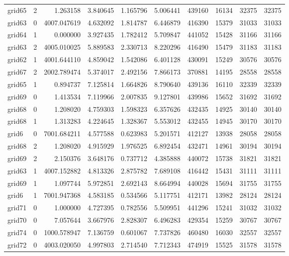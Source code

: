 \begin{longtable}{|l|r|r|r|r|r|r|r|r|r|}
grid65 & 2 & 1.263158 & 3.840645 & 1.165796 & 5.006441 & 439160 & 16134 & 32375 & 32375 \\
grid63 & 0 & 4007.047619 & 4.632092 & 1.814787 & 6.446879 & 416390 & 15379 & 31033 & 31033 \\
grid64 & 1 & 0.000000 & 3.927435 & 1.782412 & 5.709847 & 441052 & 15428 & 31166 & 31166 \\
grid63 & 2 & 4005.010025 & 5.889583 & 2.330713 & 8.220296 & 416490 & 15479 & 31183 & 31183 \\
grid62 & 1 & 4001.644110 & 4.859042 & 1.542086 & 6.401128 & 430091 & 15249 & 30576 & 30576 \\
grid67 & 2 & 2002.789474 & 5.374017 & 2.492156 & 7.866173 & 370881 & 14195 & 28558 & 28558 \\
grid65 & 1 & 0.894737 & 7.125814 & 1.664826 & 8.790640 & 439136 & 16110 & 32339 & 32339 \\
grid69 & 0 & 1.413534 & 7.119966 & 2.007835 & 9.127801 & 439986 & 15652 & 31692 & 31692 \\
grid68 & 0 & 1.208020 & 4.759303 & 1.598323 & 6.357626 & 432435 & 14925 & 30140 & 30140 \\
grid68 & 1 & 1.313283 & 4.224645 & 1.328367 & 5.553012 & 432455 & 14945 & 30170 & 30170 \\
grid6 & 0 & 7001.684211 & 4.577588 & 0.623983 & 5.201571 & 412127 & 13938 & 28058 & 28058 \\
grid68 & 2 & 1.208020 & 4.915929 & 1.976525 & 6.892454 & 432471 & 14961 & 30194 & 30194 \\
grid69 & 2 & 2.150376 & 3.648176 & 0.737712 & 4.385888 & 440072 & 15738 & 31821 & 31821 \\
grid63 & 1 & 4007.152882 & 4.813326 & 2.875782 & 7.689108 & 416442 & 15431 & 31111 & 31111 \\
grid69 & 1 & 1.097744 & 5.972851 & 2.692143 & 8.664994 & 440028 & 15694 & 31755 & 31755 \\
grid6 & 1 & 7001.947368 & 4.583185 & 0.534566 & 5.117751 & 412171 & 13982 & 28124 & 28124 \\
grid71 & 0 & 1.000000 & 4.727395 & 0.782556 & 5.509951 & 441296 & 15241 & 31032 & 31032 \\
grid70 & 0 & 7.057644 & 3.667976 & 2.828307 & 6.496283 & 429354 & 15259 & 30767 & 30767 \\
grid74 & 0 & 1000.578947 & 7.136759 & 0.601067 & 7.737826 & 460480 & 16030 & 32557 & 32557 \\
grid72 & 0 & 4003.020050 & 4.997803 & 2.714540 & 7.712343 & 474919 & 15525 & 31578 & 31578 \\

\end{longtable}
